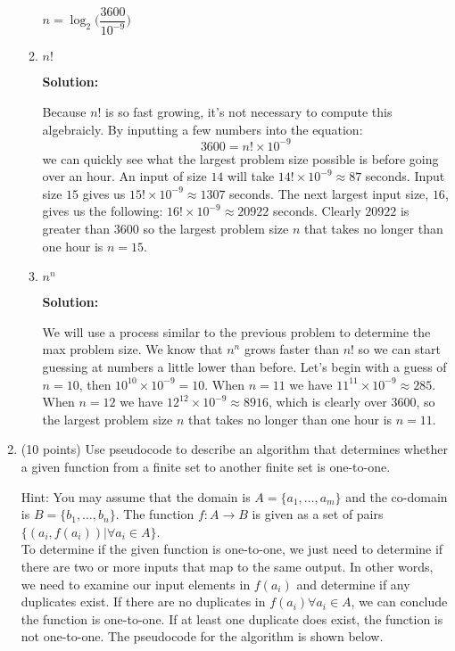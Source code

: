\documentclass[11pt]{article}
\begin{document}
\begin{enumerate}
\begin{enumerate}
$n = \log_2{\bigg(\dfrac{3600}{10^{-9}}\bigg)}$

\item $n!$

\textbf{Solution: }

Because $n!$ is so fast growing, it's not necessary to compute this algebraicly.  By inputting a few numbers into the equation:
$$ 3600 = n! \times 10^{-9} $$
we can quickly see what the largest problem size possible is before going over an hour.  An input of size $14$ will take $14! \times 10^{-9} \approx 87$ seconds.  Input size $15$ gives us $15! \times 10^{-9} \approx 1307$ seconds.  The next largest input size, $16$, gives us the following: $16! \times 10^{-9} \approx 20922$ seconds.  Clearly $20922$ is greater than $3600$ so the largest problem size $n$ that takes no longer than one hour is $n = 15$.  

\item $n^n$

\textbf{Solution: }

We will use a process similar to the previous problem to determine the max problem size.  We know that $n^n$ grows faster than $n!$ so we can start guessing at numbers a little lower than before.  Let's begin with a guess of $n=10$, then $10^{10} \times 10^{-9} = 10$.  When $n=11$ we have $11^{11} \times 10^{-9} \approx 285$.  When $n=12$ we have $12^{12} \times 10^{-9} \approx 8916$, which is clearly over $3600$, so the largest problem size $n$ that takes no longer than one hour is $n = 11$.  

\end{enumerate}

\item (10 points) Use pseudocode to describe an algorithm that determines whether a given function from a finite set to another finite set is one-to-one.

Hint: You may assume that the domain is $A=\{a_1,\ldots,a_m\}$ and the co-domain is $B=\{b_1,\ldots,b_n\}$. The function $f: A\rightarrow B$ is given as a set of pairs $\{(a_i,f(a_i))|\forall a_i\in A\}$.
\\

To determine if the given function is one-to-one, we just need to determine if there are two or more inputs that map to the same output.  In other words, we need to examine our input elements in $f(a_i)$ and determine if any duplicates exist.  If there are no duplicates in $f(a_i) \forall a_i \in A$, we can conclude the function is one-to-one.  If at least one duplicate does exist, the function is not one-to-one.  The pseudocode for the algorithm is shown below.  


\end{enumerate}
\end{document}
